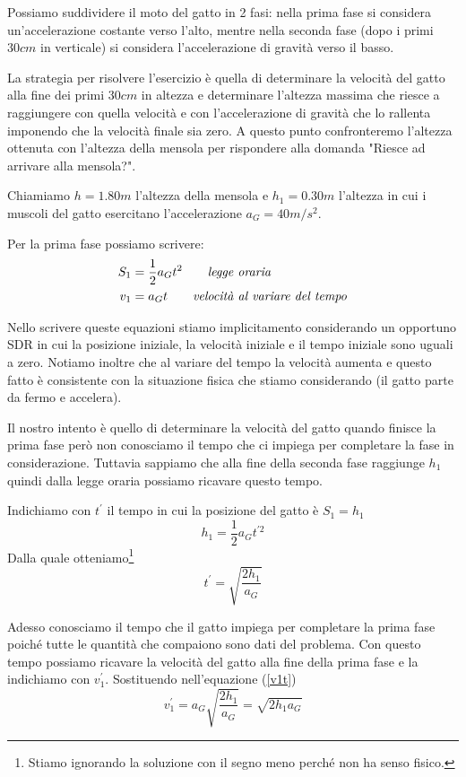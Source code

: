 \documentclass{article}
\begin{document}
Possiamo suddividere il moto del gatto in 2 fasi: nella prima fase si considera un'accelerazione costante verso l'alto, mentre nella seconda fase (dopo i primi $30cm$ in verticale) si considera l'accelerazione di gravità verso il basso. 

La strategia per risolvere l'esercizio è quella di determinare la velocità del gatto alla fine dei primi $30cm$ in altezza e determinare l'altezza massima che riesce a raggiungere con quella velocità e con l'accelerazione di gravità che lo rallenta imponendo che la velocità finale sia zero. A questo punto confronteremo l'altezza ottenuta con l'altezza della mensola per rispondere alla domanda "Riesce ad arrivare alla mensola?".

Chiamiamo $h=1.80m$ l'altezza della mensola e $h_1=0.30m$ l'altezza in cui i muscoli del gatto esercitano l'accelerazione $a_G=40m/s^2$.

Per la prima fase possiamo scrivere:
\begin{align}
  S_1 &= \frac{1}{2}a_G t^2 \qquad\text{\textit{legge oraria}} \\
  v_1 &= a_G t \qquad\text{\textit{velocità al variare del tempo}} \label{v1t}
\end{align}

Nello scrivere queste equazioni stiamo implicitamento considerando un opportuno SDR in cui la posizione iniziale, la velocità iniziale e il tempo iniziale sono uguali a zero. Notiamo inoltre che al variare del tempo la velocità aumenta e questo fatto è consistente con la situazione fisica che stiamo considerando (il gatto parte da fermo e accelera).

Il nostro intento è quello di determinare la velocità del gatto quando finisce la prima fase però non conosciamo il tempo che ci impiega per completare la fase in considerazione. Tuttavia sappiamo che alla fine della seconda fase raggiunge $h_1$ quindi dalla legge oraria possiamo ricavare questo tempo.

Indichiamo con $t^\prime$ il tempo in cui la posizione del gatto è $S_1 = h_1$
\begin{equation}
  h_1 = \frac{1}{2}a_G t^{\prime 2}
\end{equation}
Dalla quale otteniamo\footnote{Stiamo ignorando la soluzione con il segno meno perché non ha senso fisico.}
\begin{equation}
  t^\prime = \sqrt{\frac{2h_1}{a_G}}
\end{equation}

Adesso conosciamo il tempo che il gatto impiega per completare la prima fase poiché tutte le quantità che compaiono sono dati del problema. Con questo tempo possiamo ricavare la velocità del gatto alla fine della prima fase e la indichiamo con $v^\prime_1$. Sostituendo nell'equazione (\ref{v1t})
\begin{equation}\label{v1final}
  v^\prime_1 = a_G \sqrt{\frac{2h_1}{a_G}} = \sqrt{2h_1 a_G}
\end{equation}
\end{document}
